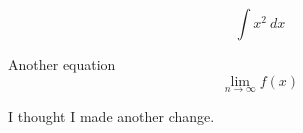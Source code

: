 \documentclass[11pt]{article}
\begin{document}
$$ \int x^2 \ dx $$

Another equation
$$\lim_{n\to\infty}f(x)$$

I thought I made another change. 
\end{document}
